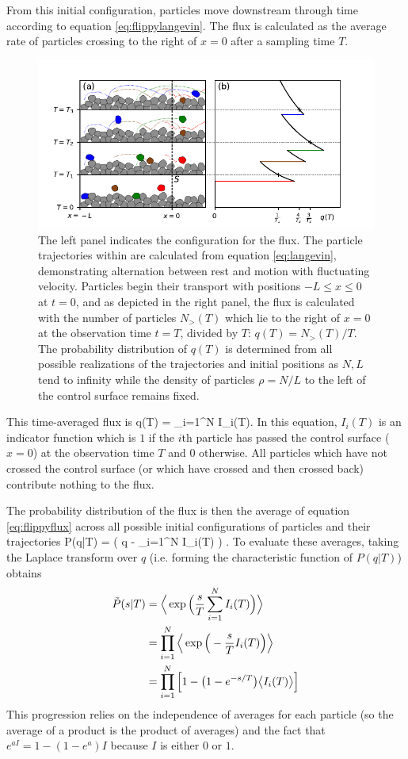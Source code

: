From this initial configuration, particles move downstream through time according to equation \ref{eq:flippylangevin}.
The flux is calculated as the average rate of particles crossing to the right of $x=0$ after a sampling time $T$.
\begin{figure}
	\centerline{\includegraphics{./figures/ch2/figure1.pdf}}
	\caption{The left panel indicates the configuration for the flux. The particle trajectories within are calculated from equation \ref{eq:langevin}, demonstrating alternation between rest and motion with fluctuating velocity. Particles begin their transport with positions $-L\leq x \leq 0$ at $t=0$, and as depicted in the right panel, the flux is calculated with the number of particles $N_>(T)$ which lie to the right of $x=0$ at the observation time $t=T$, divided by $T$: $q(T) = N_>(T)/T$. The probability distribution of $q(T)$ is determined from all possible realizations of the trajectories and initial positions as $N,L$ tend to infinity while the density of particles $\rho=N/L$ to the left of the control surface remains fixed.}
	\label{fig:flipflopfig1}
\end{figure}
This time-averaged flux is
\be q(T) = \sum_{i=1}^N I_i(T). \label{eq:flippyflux} \ee
In this equation, $I_i(T)$ is an indicator function which is $1$ if the $i$th particle has passed the control surface ($x=0$) at the observation time $T$ and $0$ otherwise.
All particles which have not crossed the control surface (or which have crossed and then crossed back) contribute nothing to the flux.

The probability distribution of the flux is then the average of equation \ref{eq:flippyflux} across all possible initial configurations of particles and their trajectories
\be P(q|T) = \Big \bra \delta\Big( q - \sum_{i=1}^N I_i(T) \Big) \Big\ket. \ee
To evaluate these averages, taking the Laplace transform over $q$ (i.e. forming the characteristic function of $P(q|T)$) obtains
\begin{align} \tilde{P}(s|T) &=  \Big\langle \exp\Big(\frac{s}{T}\sum_{i=1}^N I_i(T)\Big)\Big\rangle \\
	&=  \prod_{i=1}^N \Big\langle \exp\Big(-\frac{s}{T}I_i(T)\Big)\Big\rangle \\
	&= \prod_{i=1}^N \Big[1-\big(1-e^{-s/T}\big)\big\langle I_i(T) \big\rangle \Big] \label{eq:flippycharacteristic}\end{align}
This progression relies on the independence of averages for each particle (so the average of a product is the product of averages) and the fact that  $e^{a I} = 1-(1-e^a)I$ because $I$ is either $0$ or $1$.

